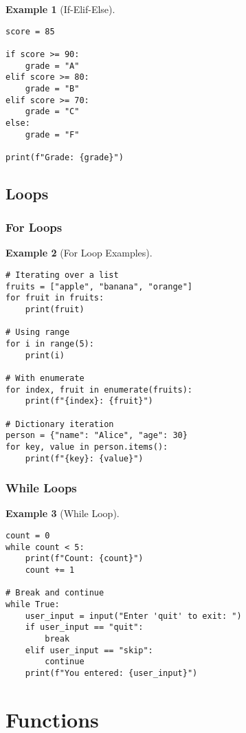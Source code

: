 \documentclass[11pt]{article}
\newtheorem{example}{Example}[section]
\begin{document}
\begin{example}[If-Elif-Else]
\begin{lstlisting}
score = 85

if score >= 90:
    grade = "A"
elif score >= 80:
    grade = "B"
elif score >= 70:
    grade = "C"
else:
    grade = "F"

print(f"Grade: {grade}")
\end{lstlisting}
\end{example}

\subsection{Loops}

\subsubsection{For Loops}

\begin{example}[For Loop Examples]
\begin{lstlisting}
# Iterating over a list
fruits = ["apple", "banana", "orange"]
for fruit in fruits:
    print(fruit)

# Using range
for i in range(5):
    print(i)

# With enumerate
for index, fruit in enumerate(fruits):
    print(f"{index}: {fruit}")

# Dictionary iteration
person = {"name": "Alice", "age": 30}
for key, value in person.items():
    print(f"{key}: {value}")
\end{lstlisting}
\end{example}

\subsubsection{While Loops}

\begin{example}[While Loop]
\begin{lstlisting}
count = 0
while count < 5:
    print(f"Count: {count}")
    count += 1

# Break and continue
while True:
    user_input = input("Enter 'quit' to exit: ")
    if user_input == "quit":
        break
    elif user_input == "skip":
        continue
    print(f"You entered: {user_input}")
\end{lstlisting}
\end{example}

\section{Functions}
\end{document}
